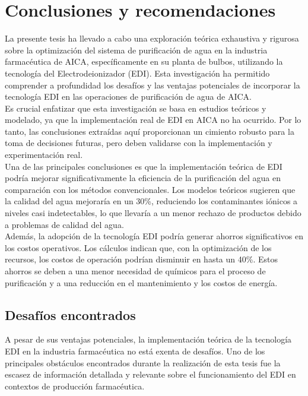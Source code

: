 \chapter{Conclusiones y recomendaciones}


La presente tesis ha llevado a cabo una
exploración teórica exhaustiva y rigurosa sobre la
optimización del sistema de purificación de agua en la industria
farmacéutica de AICA, específicamente en su planta de bulbos,
utilizando la tecnología del Electrodeionizador (EDI).
Esta investigación ha permitido comprender a profundidad
los desafíos y las ventajas potenciales de incorporar la
tecnología EDI en las operaciones de purificación de agua de AICA.\\

Es crucial enfatizar que esta investigación se basa en estudios teóricos y
modelado, ya que la implementación real de EDI en AICA no ha ocurrido.
Por lo tanto, las conclusiones extraídas aquí proporcionan un cimiento
robusto para la toma de decisiones futuras, pero deben validarse con la
implementación y experimentación real.\\

Una de las principales conclusiones es que la implementación teórica de
EDI podría mejorar significativamente la eficiencia de la purificación
del agua en comparación con los métodos convencionales. Los modelos
teóricos sugieren que la calidad del agua mejoraría en un 30\%,
reduciendo los contaminantes iónicos a niveles casi indetectables, lo que
llevaría a un menor rechazo de productos debido a problemas de calidad del agua.\\

Además, la adopción de la tecnología EDI podría generar ahorros significativos
en los costos operativos. Los cálculos indican que, con la optimización de
los recursos, los costos de operación podrían disminuir en hasta un 40\%.
Estos ahorros se deben a una menor necesidad de químicos para el proceso de
purificación y a una reducción en el mantenimiento y los costos de energía.\\

\section*{Desafíos encontrados}


A pesar de sus ventajas potenciales, la implementación teórica de la tecnología EDI en
la industria farmacéutica no está exenta de desafíos. Uno de los principales obstáculos
encontrados durante la realización de esta tesis fue la escasez de información detallada
y relevante sobre el funcionamiento del EDI en contextos de producción farmacéutica.\\

